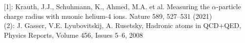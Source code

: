\documentclass[preview]{standalone}
\begin{document}
\begin{center}
[1]: Krauth, J.J., Schuhmann, K., Ahmed, M.A. et al. Measuring the $\alpha$-particle charge radius with muonic helium-4 ions. Nature 589, 527–531 (2021)\\ (2): J. Gasser, V.E. Lyubovitskij, A. Rusetsky, Hadronic atoms in QCD+QED, Physics Reports, Volume 456, Issues 5–6, 2008
\end{center}
\end{document}
